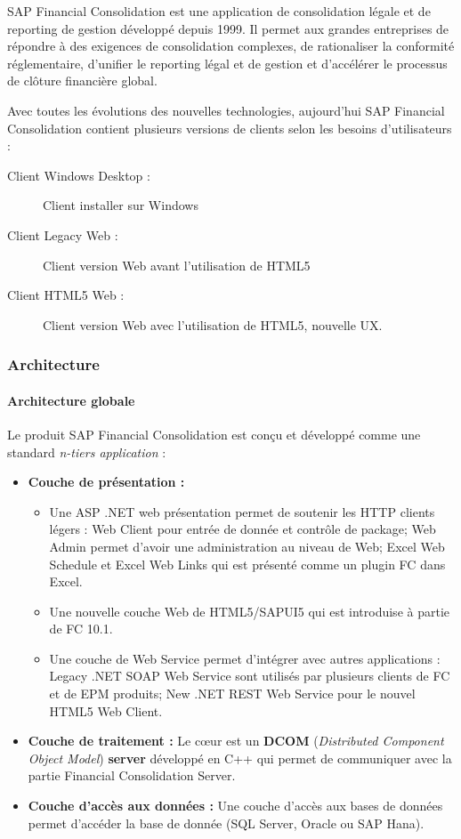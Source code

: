 \par SAP Financial Consolidation est une application de consolidation légale et de reporting de gestion développé depuis 1999. Il permet aux grandes entreprises de répondre à des exigences de consolidation complexes, de rationaliser la conformité réglementaire, d'unifier le reporting légal et de gestion et d'accélérer le processus de clôture financière global.\cite{About-FC}

\par Avec toutes les évolutions des nouvelles technologies, aujourd'hui SAP Financial Consolidation contient plusieurs versions de clients selon les besoins d'utilisateurs : 
    \begin{description}
        \item [Client Windows Desktop :] Client installer sur Windows
        \item [Client Legacy Web :] Client version Web avant l'utilisation de HTML5
        \item [Client HTML5 Web :] Client version Web avec l'utilisation de HTML5, nouvelle UX.
    \end{description}
    \subsubsection{Architecture}
    
    \paragraph{Architecture globale}
    Le produit SAP Financial Consolidation est conçu et développé comme une standard \textit{n-tiers application} :
    \begin{itemize}[label=\textbullet]
        \item \textbf{Couche de présentation :} 
            \begin{itemize}
                \item Une ASP .NET web présentation permet de soutenir les HTTP clients légers : Web Client pour entrée de donnée et contrôle de package; Web Admin permet d'avoir une administration au niveau de Web; Excel Web Schedule et Excel Web Links qui est présenté comme un plugin FC dans Excel.
                \item Une nouvelle couche Web de HTML5/SAPUI5 qui est introduise à partie de FC 10.1.
                \item Une couche de Web Service permet d'intégrer avec autres applications : Legacy .NET SOAP Web Service sont utilisés par plusieurs clients de FC et de EPM produits; New .NET REST Web Service pour le nouvel HTML5 Web Client.
            \end{itemize}
        \item \textbf{Couche de traitement :} Le cœur est un \textbf{DCOM} (\textit{Distributed Component Object Model}) \textbf{server} développé en C++ qui permet de communiquer avec la partie Financial Consolidation Server.
        \item \textbf{Couche d'accès aux données :} Une couche d'accès aux bases de données permet d'accéder la base de donnée (SQL Server, Oracle ou SAP Hana).
    \end{itemize}
    
